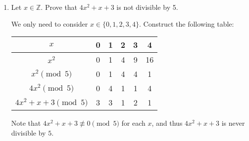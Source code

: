 \documentclass[11pt]{article}
\def\integers{\mathbb{Z}}
\begin{document}
\begin{enumerate}
\begin{enumerate}
\begin{Solution}
\end{Solution}

\item The sum of any four consecutive natural numbers is NOT divisible by 4.

\begin{Solution}
 Symbolically, we can express this statement as:
 \begin{center}
  $\forall n\in\integers, \, 4\nmid \big(n+(n+1)+(n+2)+(n+3)\big)$
 \end{center}
\begin{proof}
 Let $n\in\integers$ be arbitrary. Now,
 \begin{align*}
  n+(n+1)+(n+2)+(n+3) 
  & \equiv 4n + 1+2+3&&\pmod{4}\\
  & \equiv 4n+7&&\pmod{4}\\
  & \equiv 7&&\pmod{4},
 \end{align*}
but $4\nmid 7$ and thus $4\nmid \big(n+(n+1)+(n+2)+(n+3)\big)$. 
\end{proof}

\end{Solution}
\end{enumerate}

\item Let $x \in \integers$. Prove that $4 x^2 + x + 3$ is not divisible by 5.

\begin{Solution}
  We only need to consider $x\in\{0,1,2,3,4\}$. Construct the following table:
  \begin{center}
  \begin{tabular}{ |c|c|c|c|c|c| } 
 \hline
$x$ & 0 & 1 & 2 & 3 & 4\\ \hline
 $x^2$ & 0 & 1 & 4 & 9 & 16\\ 
 $x^2\pmod{5}$ & 0 & 1 & 4 & 4 & 1\\ 
 $4x^2\pmod{5}$ & 0 & 4 & 1 & 1 & 4\\ 
 $4x^2+x +3\pmod{5}$ & 3 & 3 & 1 & 2 & 1\\ 
 \hline
\end{tabular}
  \end{center}

Note that $4x^2+x +3\not\equiv 0\pmod{5}$ for each $x$, and thus $4x^2+x +3$ is never divisible by $5$.
\end{Solution}



\end{enumerate}
\end{document}
